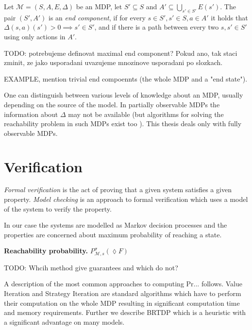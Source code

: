 \begin{definition}
Let $\mathcal{M} = (S, A, E, \Delta)$ be an MDP,
let $S' \subseteq S$ and $A' \subseteq \bigcup_{s' \in S'} E(s')$.
The pair $(S', A')$ is an {\em end component},
if for every $s \in S', s' \in S, a \in A'$ it holds that
$\Delta(s,a)(s') > 0 \implies s' \in S'$,
and if there is a path between every two $s, s' \in S'$
using only actions in $A'$.
\end{definition}

TODO: potrebujeme definovat maximal end component? Pokud ano, tak staci
zminit, ze jako usporadani uvazujeme mnozinove usporadani po slozkach.

EXAMPLE, mention trivial end compoennts (the whole MDP and a "end
state").


One can distinguish between various levels of knowledge about an MDP,
usually depending on the source of the model.
In partially observable MDPs the information about $\Delta$ may not be
available (but algorithms for solving the reachability
problem in such MDPs exist too \parencite{atva14}). This thesis deals
only with fully observable MDPs.


\section{Verification}

{\em Formal verification} is the act of proving that a given system satisfies
a given property. {\em Model
checking} is an approach to formal verification which uses a model of
the system to verify the property.

In our case the systems are modelled as Markov decision processes and
the properties are concerned about maximum probability of reaching a state.

\noindent \textbf{Reachability probability.}
$P^\sigma_{\mathcal{M},s}(\lozenge F)$

TODO: Whcih method give guarantees and which do not?

A description of the most common approaches to computing Pr... follows.
Value Iteration and Strategy Iteration are
standard algorithms which have to perform their computation on the
whole MDP resulting in significant computation time and memory
requirements. Further we describe BRTDP which is a heuristic with
a significant advantage on many models.


